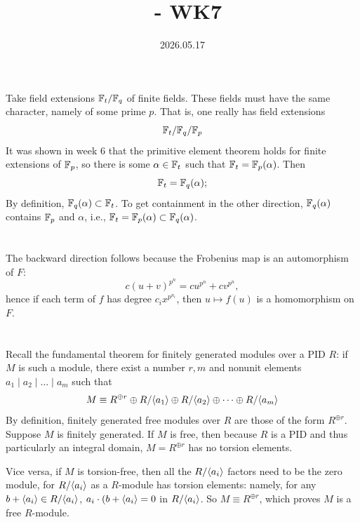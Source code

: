 \documentclass[12pt]{article}
\title{\course\ - WK7}
\author{\myname}
\date{2026.05.17}
\begin{document}
\maketitle
\thispagestyle{fancy}

\newtheorem*{hint}{Hint}


\section{} 
Take field extensions $\mathbb{F}_{t} / \mathbb{F}_q$ of finite fields. 
These fields must have the same character, namely of some prime $p$. 
That is, one really has field extensions 
$$\mathbb{F}_{t} / \mathbb{F}_{q} / \mathbb{F}_{p}$$ 
It was shown in week 6 that the primitive element theorem holds for finite extensions of $\mathbb{F}_p$, so there is some $\alpha \in \mathbb{F}_{t}$ such that $\mathbb{F}_{t} = \mathbb{F}_{p}(\alpha)$. 
Then 
$$\mathbb{F}_{t} = \mathbb{F}_{q}(\alpha);$$
By definition, $\mathbb{F}_{q}(\alpha) \subset \mathbb{F}_{t}$. 
To get containment in the other direction, $\mathbb{F}_{q}(\alpha)$ contains $\mathbb{F}_p$ and $\alpha$, i.e., 
$\mathbb{F}_{t} = \mathbb{F}_{p} (\alpha) \subset \mathbb{F}_{q}(\alpha)$. 

\section{} 
The backward direction follows because the Frobenius map is an automorphism of $F$: 
$$c(u + v)^{p^n} = cu^{p^n} + cv^{p^n},$$ 
hence if each term of $f$ has degree $c_i x^{p^{n_i}}$, then $u \mapsto f(u)$ is a homomorphism on $F$. 

\section{} 
Recall the fundamental theorem for finitely generated modules over a PID $R$: 
if $M$ is such a module, there exist a number $r, m$ and nonunit elements $a_1 \mid a_2 \mid \ldots \mid a_m$ such that 
$$M \equiv R^{\oplus r} \oplus R / \<a_1\> \oplus R / \<a_2\> \oplus \cdots \oplus R / \<a_m\>$$
By definition, finitely generated free modules over $R$ are those of the form $R^{\oplus r}$. 
Suppose $M$ is finitely generated. 
If $M$ is free, then because $R$ is a PID and thus particularly an integral domain, $M = R^{\oplus r}$ has no torsion elements. 

Vice versa, if $M$ is torsion-free, then all the $R / \langle a_i\rangle$ factors need to be the zero module, for $R / \langle a_i\rangle$ as a $R$-module has torsion elements:
namely, for any $b + \langle a_i\rangle \in R / \langle a_i\rangle$, $a_i \cdot (b + \langle a_i\rangle = 0$ in $R / \langle a_i\rangle$. 
So $M \equiv R^{\oplus r}$, which proves $M$ is a free $R$-module. 
\end{document}
